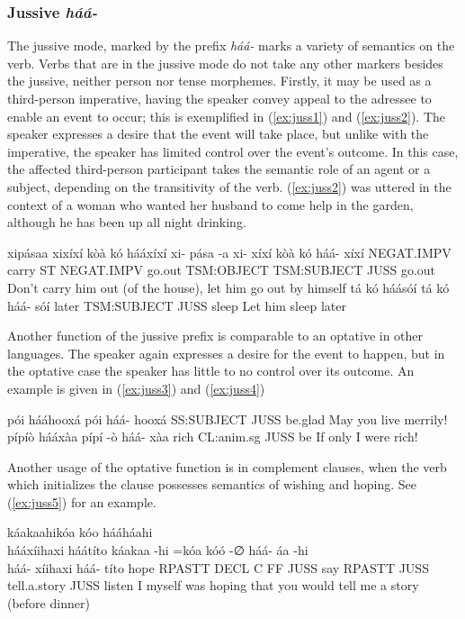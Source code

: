 \documentclass[a4paper, 12pt, oneside]{memoir}
\newcommand{\emh}[1]{\textit{#1}}
\begin{document}
\subsubsection{Jussive \emh{háá-}}
The jussive mode, marked by the prefix \emh{háá-} marks a variety of semantics on the verb. Verbs that are in the jussive mode do not take any other markers besides the jussive, neither person nor tense morphemes. Firstly, it may be used as a third-person imperative, having the speaker convey appeal to the adressee to enable an event to occur; this is exemplified in (\ref{ex:juss1}) and (\ref{ex:juss2}). The speaker expresses a desire that the event will take place, but unlike with the imperative, the speaker has limited control over the event's outcome. In this case, the affected third-person participant takes the semantic role of an agent or a subject, depending on the transitivity of the verb. (\ref{ex:juss2}) was uttered in the context of a woman who wanted her husband to come help in the garden, although he has been up all night drinking.
\begin{examples}
    \ex \label{ex:juss1}
    \words xipásaa xixíxí kòà kó hááxíxí
    \bits xi- pása -a xi- xíxí kòà kó háá- xíxí
    \gloss NEGAT.IMPV carry ST NEGAT.IMPV go.out TSM:OBJECT TSM:SUBJECT JUSS go.out
    \tr Don't carry him out (of the house), let him go out by himself
    \ex \label{ex:juss2}
    \words tá kó háásóí
    \bits tá kó háá- sóí
    \gloss later TSM:SUBJECT JUSS sleep 
    \tr Let him sleep later
\end{examples}
Another function of the jussive prefix is comparable to an optative in other languages. The speaker again expresses a desire for the event to happen, but in the optative case the speaker has little to no control over its outcome. An example is given in (\ref{ex:juss3}) and (\ref{ex:juss4})
\begin{examples}
    \ex \label{ex:juss3}
    \words pói hááhooxá
    \bits pói háá- hooxá 
    \gloss SS:SUBJECT JUSS be.glad
    \tr May you live merrily!
    \ex \label{ex:juss4}
    \words pípíò hááxàa
    \bits pípí -ò háá- xàa
    \gloss rich CL:anim.sg JUSS be 
    \tr If only I were rich!
\end{examples}
Another usage of the optative function is in complement clauses, when the verb which initializes the clause possesses semantics of wishing and hoping. See (\ref{ex:juss5}) for an example.
\begin{examples}
    \ex \label{ex:juss5}
    \words káakaahikóa kóo hááháahi \\ hááxíihaxi háátíto
    \bits káakaa -hi =kóa kóó -∅ háá- áa -hi \\ háá- xíihaxi háá- títo
    \gloss hope RPASTT DECL C FF JUSS say RPASTT JUSS tell.a.story JUSS listen
    \tr I myself was hoping that you would tell me a story (before dinner)
\end{examples}
\end{document}
